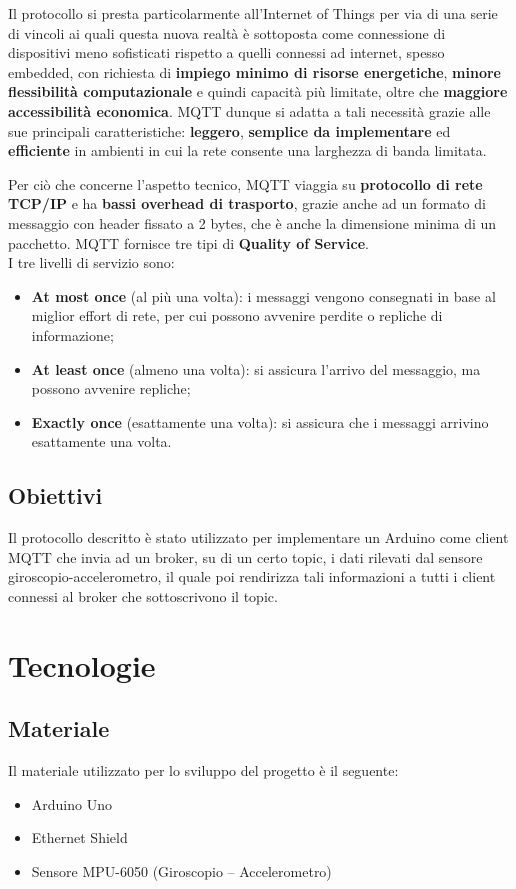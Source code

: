 \documentclass[]{scrartcl}
\begin{document}
Il protocollo si presta particolarmente all'Internet of Things per via di una serie di vincoli ai quali questa nuova realtà è sottoposta come connessione di dispositivi meno sofisticati rispetto a quelli connessi ad internet, spesso embedded, con richiesta di \textbf{impiego minimo di risorse energetiche}, \textbf{minore flessibilità computazionale} e quindi capacità più limitate, oltre che\textbf{ maggiore accessibilità economica}. MQTT dunque si adatta a tali necessità grazie alle sue principali caratteristiche: \textbf{leggero}, \textbf{semplice da implementare} ed \textbf{efficiente} in ambienti in cui la rete consente una larghezza di banda limitata.

Per ciò che concerne l'aspetto tecnico, MQTT viaggia su \textbf{protocollo di rete TCP/IP} e ha \textbf{bassi overhead di trasporto}, grazie anche ad un formato di messaggio con header fissato a 2 bytes, che è anche la dimensione minima di un pacchetto. MQTT fornisce tre tipi di \textbf{Quality of Service}. 
\\I tre livelli di servizio sono:
\begin{itemize}
	\item  \textbf{At most once} (al più una volta): i messaggi vengono consegnati in base al miglior effort di rete, per cui possono avvenire perdite o repliche di informazione;
	\item \textbf{At least once} (almeno una volta): si assicura l’arrivo del messaggio, ma possono avvenire repliche;
	\item \textbf{Exactly once} (esattamente una volta): si assicura che i messaggi arrivino esattamente una volta.
\end{itemize}

\subsection{Obiettivi}

Il protocollo descritto è stato utilizzato per implementare un Arduino come client MQTT che invia ad un broker, su di un certo topic, i dati rilevati dal sensore giroscopio-accelerometro, il quale poi rendirizza tali informazioni a tutti i client connessi al broker che sottoscrivono il topic.

\section{Tecnologie}
\subsection{Materiale}
Il materiale utilizzato per lo sviluppo del progetto è il seguente: 
\begin{itemize}
	\item Arduino Uno
	\item Ethernet Shield
	\item Sensore MPU-6050 (Giroscopio – Accelerometro) 
\end{itemize}	
\end{document}
